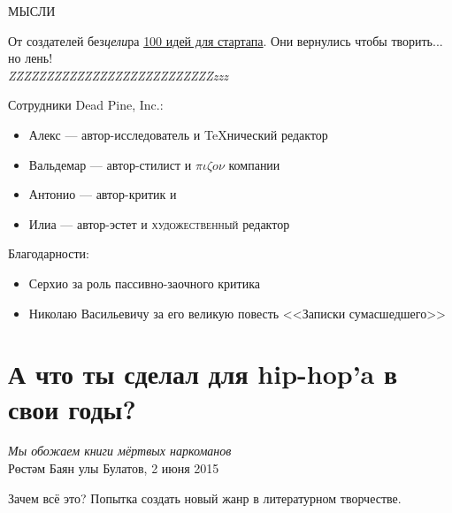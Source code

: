 \documentclass{ideas}
\renewcommand{\author}{Dead Pine, Inc.}
\begin{document}
\begin{titlepage}

\vspace*{\fill}
\begin{center}
\Huge МЫСЛИ
\end{center}
\vspace*{\fill}
\end{titlepage}

    От создателей без\emph{цели}ра \href{https://antoniii.github.io/}{100 идей для стартапа}.
    Они вернулись чтобы творить... но лень!\\

    \emph{\Huge{ZZZ}\LARGE{ZZZ}\Large{ZZZ}\large{ZZZ}ZZZ\small{ZZZ}\footnotesize{ZZZ}\scriptsize{ZZZ}\tiny{ZZZ}\tiny{zzz}}
\newpage


\vspace*{\fill}
\begin{center}
Сотрудники \author:
  \begin{itemize}
    \item Алекс ---  автор-исследователь и {\TeX}нический редактор
    \item Вальдемар --- автор-стилист и \( \pi\iota\zeta o \nu \) компании
    \item Антонио --- автор-критик и 
    \item Илиа --- автор-эстет и {\selectfont\scshape художественный} редактор
  \end{itemize}

\vfill
Благодарности:
  \begin{itemize}
    \item Серхио за роль пассивно-заочного критика
    \item Николаю Васильевичу за его великую повесть <<Записки сумасшедшего>>
  \end{itemize}
\end{center}
\vfill
\newpage
\section*{А что ты сделал для hip-hop'a в свои годы?}\label{section:one}
\begin{displayquote}
\begin{flushright}
    \textit{Мы обожаем книги мёртвых наркоманов}\\
    Рөстәм Баян улы Булатов, 2 июня 2015
\end{flushright}
\end{displayquote}
Зачем всё это? Попытка создать новый жанр в литературном творчестве.
\end{document}

